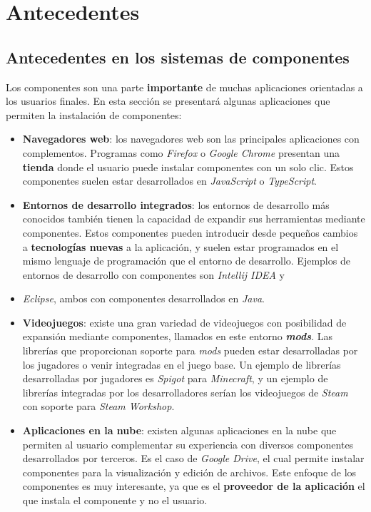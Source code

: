 \chapter{Antecedentes}\label{ch:antecedentes}


\section{Antecedentes en los sistemas de componentes}
\label{sec:antecedentes-en-los-sistemas-de-componentes}

Los componentes son una parte \textbf{importante} de muchas aplicaciones
orientadas a los usuarios finales.
En esta sección se presentará algunas aplicaciones que permiten
la instalación de componentes:

\begin{itemize}
    \item \textbf{Navegadores web}: los navegadores web
    son las principales aplicaciones con complementos.
    Programas como \textit{Firefox}\cite{FIREFOX} o
    \textit{Google Chrome}\cite{CHROME}
    presentan una \textbf{tienda} donde el usuario puede instalar
    componentes con un solo clic.
    Estos componentes suelen estar desarrollados en \textit{JavaScript}
    o \textit{TypeScript}.
    \item \textbf{Entornos de desarrollo integrados}: los entornos de
    desarrollo más conocidos también tienen la capacidad de expandir
    sus herramientas mediante componentes.
    Estos componentes pueden introducir desde pequeños cambios
    a \textbf{tecnologías nuevas} a la aplicación, y suelen
    estar programados en el mismo lenguaje de programación
    que el entorno de desarrollo.
    Ejemplos de entornos de desarrollo con componentes
    son \textit{Intellij IDEA}\cite{INTELLIJIDEA} y
    \item \textit{Eclipse}\cite{ECLIPSE},
    ambos con componentes desarrollados en \textit{Java}\cite{JAVA}.
    \item \textbf{Videojuegos}: existe una gran variedad
    de videojuegos con posibilidad de expansión mediante
    componentes, llamados en este entorno \textit{\textbf{mods}}.
    Las librerías que proporcionan soporte para \textit{mods}
    pueden estar desarrolladas por los jugadores o venir
    integradas en el juego base.
    Un ejemplo de librerías desarrolladas por jugadores es
    \textit{Spigot}\cite{SPIGOT} para \textit{Minecraft}, y un ejemplo
    de librerías integradas por los desarrolladores
    serían los videojuegos de \textit{Steam} con soporte
    para \textit{Steam Workshop}\cite{STEAM_WORKSHOP}.
    \item \textbf{Aplicaciones en la nube}: existen
    algunas aplicaciones en la nube que permiten
    al usuario complementar su experiencia con diversos
    componentes desarrollados por terceros.
    Es el caso de \textit{Google Drive}, el cual permite
    instalar componentes para la visualización y
    edición de archivos.
    Este enfoque de los componentes es muy interesante,
    ya que es el \textbf{proveedor de la aplicación} el que
    instala el componente y no el usuario.
\end{itemize}


